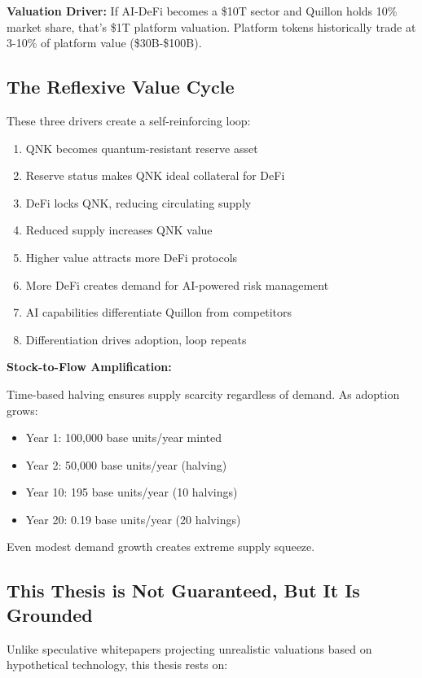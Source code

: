 \documentclass[11pt,a4paper]{article}
\begin{document}
\textbf{Valuation Driver:} If AI-DeFi becomes a \$10T sector and Quillon holds 10\% market share, that's \$1T platform valuation. Platform tokens historically trade at 3-10\% of platform value (\$30B-\$100B).

\subsection{The Reflexive Value Cycle}

These three drivers create a self-reinforcing loop:

\begin{enumerate}[leftmargin=*]
\item QNK becomes quantum-resistant reserve asset
\item Reserve status makes QNK ideal collateral for DeFi
\item DeFi locks QNK, reducing circulating supply
\item Reduced supply increases QNK value
\item Higher value attracts more DeFi protocols
\item More DeFi creates demand for AI-powered risk management
\item AI capabilities differentiate Quillon from competitors
\item Differentiation drives adoption, loop repeats
\end{enumerate}

\textbf{Stock-to-Flow Amplification:}

Time-based halving ensures supply scarcity regardless of demand. As adoption grows:
\begin{itemize}[leftmargin=*]
\item Year 1: 100,000 base units/year minted
\item Year 2: 50,000 base units/year (halving)
\item Year 10: 195 base units/year (10 halvings)
\item Year 20: 0.19 base units/year (20 halvings)
\end{itemize}

Even modest demand growth creates extreme supply squeeze.

\subsection{This Thesis is Not Guaranteed, But It Is Grounded}

Unlike speculative whitepapers projecting unrealistic valuations based on hypothetical technology, this thesis rests on:
\end{document}
